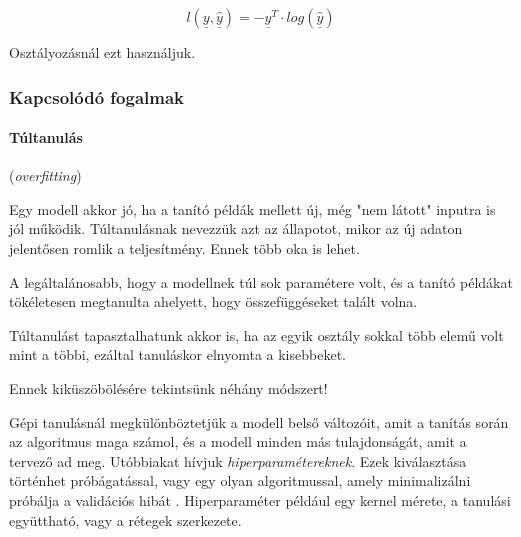 \[  l(\underline{y}, \underline{\hat{y}}) = - \underline{y}^T \cdot log(\underline{\hat{y}})  \]

\noindent
Osztályozásnál ezt használjuk.


\subsubsection{Kapcsolódó fogalmak}


\paragraph{Túltanulás} (\textit{overfitting})

%


Egy modell akkor jó, ha a tanító példák mellett új, még "nem látott"
inputra is jól működik. Túltanulásnak nevezzük
azt az állapotot, mikor az új adaton jelentősen romlik a teljesítmény.
Ennek több oka is lehet. 

A legáltalánosabb, hogy a modellnek túl sok paramétere volt, és a tanító példákat tökéletesen megtanulta ahelyett, hogy összefüggéseket talált volna.

Túltanulást tapasztalhatunk akkor is, ha az egyik osztály sokkal több elemű volt mint a többi, ezáltal tanuláskor elnyomta a kisebbeket.

Ennek kiküszöbölésére tekintsünk néhány módszert!



Gépi tanulásnál megkülönböztetjük a modell belső változóit, amit 
a tanítás során az algoritmus maga számol, és a modell minden más tulajdonságát, amit a tervező ad meg. Utóbbiakat hívjuk \textit{hiperparamétereknek}. Ezek kiválasztása történhet próbágatással, vagy egy olyan algoritmussal, amely minimalizálni próbálja a validációs hibát \cite{bergstra2013hyperopt}.  
Hiperparaméter például egy kernel mérete, a tanulási együttható, vagy a rétegek szerkezete.



